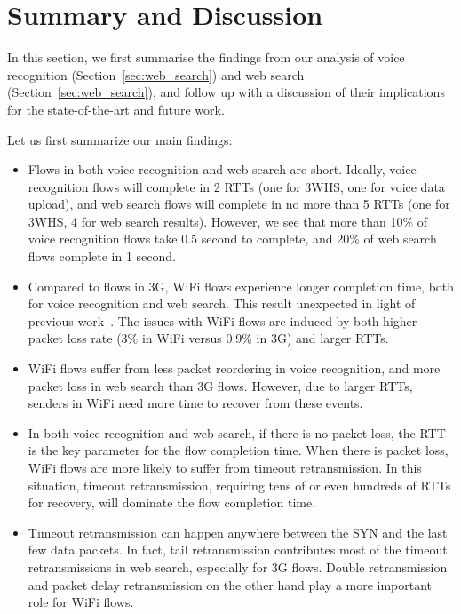 
\section{Summary and Discussion}
\label{sec:discuss}

In this section, we first summarise the findings from our analysis of voice recognition (Section~\ref{sec:web_search}) and web search (Section~\ref{sec:web_search}), and follow up with a discussion of their implications for the state-of-the-art and future work.

Let us first summarize our main findings:

\begin{itemize}
	\item Flows in both voice recognition and web search are short. Ideally, voice recognition flows will complete in 2 RTTs (one for 3WHS, one for voice data upload), and web search flows will complete in no more than 5 RTTs (one for 3WHS, 4 for web search results). However, we see that more than 10\% of voice recognition flows take 0.5 second to complete, and 20\% of web search flows complete in 1 second.

	\item Compared to flows in 3G, WiFi flows experience longer completion time, both for voice recognition and web search. This result unexpected in light of previous work~\cite{deshpande2010performance,sommers2012cell}. The issues with WiFi flows are induced by both higher packet loss rate (3\% in WiFi versus 0.9\% in 3G) and larger RTTs.

	\item WiFi flows suffer from less packet reordering in voice recognition, and more packet loss in web search than 3G flows. However, due to larger RTTs, senders in WiFi need more time to recover from these events.

	\item In both voice recognition and web search, if there is no packet loss, the RTT is the key parameter for the flow completion time. When there is packet loss, WiFi flows are more likely to suffer from timeout retransmission. In this situation, timeout retransmission, requiring tens of or even hundreds of RTTs for recovery, will dominate the flow completion time.

	\item Timeout retransmission can happen anywhere between the SYN and the last few data packets. In fact, tail retransmission contributes most of the timeout retransmissions in web search, especially for 3G flows. Double retransmission and packet delay retransmission on the other hand play a more important role for WiFi flows.
\end{itemize}

